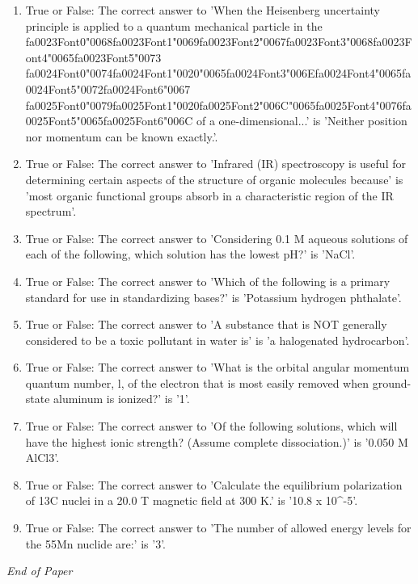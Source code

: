 \documentclass[12pt]{article}
\begin{document}
\begin{enumerate}[label=\arabic*.]
\item True or False: The correct answer to 'When the Heisenberg uncertainty principle is applied to a quantum mechanical particle in the {\csname fa0023Font0\endcsname\char"0068}{\csname fa0023Font1\endcsname\char"0069}{\csname fa0023Font2\endcsname\char"0067}{\csname fa0023Font3\endcsname\char"0068}{\csname fa0023Font4\endcsname\char"0065}{\csname fa0023Font5\endcsname\char"0073} {\csname fa0024Font0\endcsname\char"0074}{\csname fa0024Font1\endcsname\char"0020}{\char"0065}{\csname fa0024Font3\endcsname\char"006E}{\csname fa0024Font4\endcsname\char"0065}{\csname fa0024Font5\endcsname\char"0072}{\csname fa0024Font6\endcsname\char"0067} {\csname fa0025Font0\endcsname\char"0079}{\csname fa0025Font1\endcsname\char"0020}{\csname fa0025Font2\endcsname\char"006C}{\char"0065}{\csname fa0025Font4\endcsname\char"0076}{\csname fa0025Font5\endcsname\char"0065}{\csname fa0025Font6\endcsname\char"006C} of a one-dimensional...' is 'Neither position nor momentum can be known exactly.'.
\item True or False: The correct answer to 'Infrared (IR) spectroscopy is useful for determining certain aspects of the structure of organic molecules because' is 'most organic functional groups absorb in a characteristic region of the IR spectrum'.
\item True or False: The correct answer to 'Considering 0.1 M aqueous solutions of each of the following, which solution has the lowest pH?' is 'NaCl'.
\item True or False: The correct answer to 'Which of the following is a primary standard for use in standardizing bases?' is 'Potassium hydrogen phthalate'.
\item True or False: The correct answer to 'A substance that is NOT generally considered to be a toxic pollutant in water is' is 'a halogenated hydrocarbon'.
\item True or False: The correct answer to 'What is the orbital angular momentum quantum number, l, of the electron that is most easily removed when ground-state aluminum is ionized?' is '1'.
\item True or False: The correct answer to 'Of the following solutions, which will have the highest ionic strength? (Assume complete dissociation.)' is '0.050 M AlCl3'.
\item True or False: The correct answer to 'Calculate the equilibrium polarization of 13C nuclei in a 20.0 T magnetic field at 300 K.' is '10.8 x 10\^{}-5'.
\item True or False: The correct answer to 'The number of allowed energy levels for the 55Mn nuclide are:' is '3'.
\end{enumerate}

\vfill
\noindent\textit{End of Paper}
\end{document}
